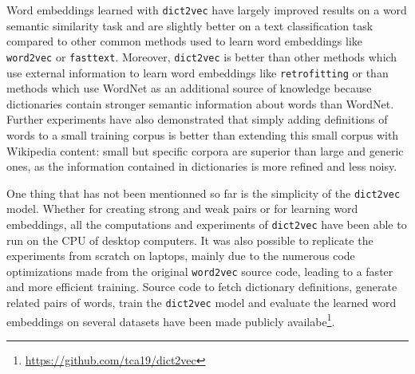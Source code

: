   Word embeddings learned with \texttt{dict2vec} have largely improved results
  on a word semantic similarity task and are slightly better on a text
  classification task compared to other common methods used to learn word
  embeddings like \texttt{word2vec} or \texttt{fasttext}. Moreover,
  \texttt{dict2vec} is better than other methods which use external information
  to learn word embeddings like \texttt{retrofitting} or than methods which use
  WordNet as an additional source of knowledge because dictionaries contain
  stronger semantic information about words than WordNet. Further experiments
  have also demonstrated that simply adding definitions of words to a small
  training corpus is better than extending this small corpus with Wikipedia
  content: small but specific corpora are superior than large and generic ones,
  as the information contained in dictionaries is more refined and less
  noisy.\medskip

  One thing that has not been mentionned so far is the simplicity of the
  \texttt{dict2vec} model. Whether for creating strong and weak pairs or for
  learning word embeddings, all the computations and experiments of
  \texttt{dict2vec} have been able to run on the CPU of desktop computers. It
  was also possible to replicate the experiments from scratch on laptops, mainly
  due to the numerous code optimizations made from the original
  \texttt{word2vec} source code, leading to a faster and more efficient
  training. Source code to fetch dictionary definitions, generate related pairs
  of words, train the \texttt{dict2vec} model and evaluate the learned word
  embeddings on several datasets have been made publicly
  availabe\footnote{\url{https://github.com/tca19/dict2vec}}.\medskip

